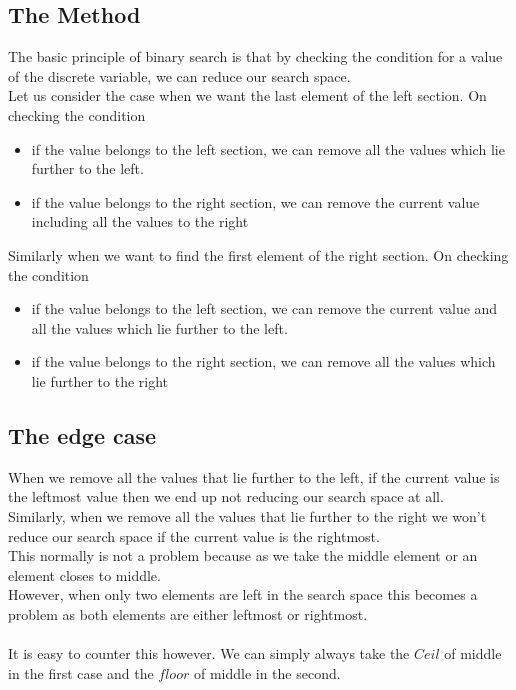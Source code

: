 \documentclass[12pt]{article}
\begin{document}
\begin{large}
\subsection{The Method}
The basic principle of binary search is that by checking the condition for a value of the discrete variable, we
can reduce our search space.\\
Let us consider the case when we want the last element of the left section.
On checking the condition
\begin{itemize}
	\item{if the value belongs to the left section, we can remove all the values which lie further to the left.}
	\item{if the value belongs to the right section, we can remove the current value including all the values to the
		right}
\end{itemize}	
Similarly when we want to find the first element of the right section.
On checking the condition
\begin{itemize}
	\item{if the value belongs to the left section, we can remove the current value and all the values which lie further
		to the left.}
	\item{if the value belongs to the right section, we can remove all the values which lie further to the right}
\end{itemize}

\subsection{The edge case}

When we remove all the values that lie further to the left, if the current value is the leftmost value then we
end up not reducing our search space at all.\\
Similarly, when we remove all the values that lie further to the right we won’t reduce our search space if the
current value is the rightmost.\\
This normally is not a problem because as we take the middle element or an element closes to middle.\\ However,
when only two elements are left in the search space this becomes a problem as both elements are either leftmost
or rightmost.\\\\
It is easy to counter this however.
We can simply always take the $Ceil$ of middle in the first case and the $floor$ of middle in the second.


\end{large}
\end{document}
